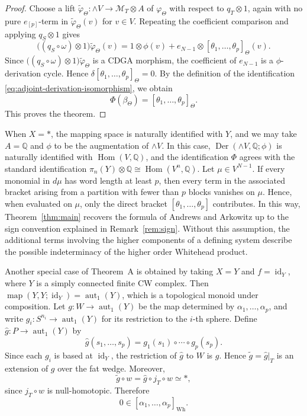 \documentclass[a4paper,10pt]{amsart}
\theoremstyle{definition}
\theoremstyle{remark}
\newcommand{\map}{\operatorname{map}}
\newcommand{\aut}{\operatorname{aut}}
\newcommand{\Der}{\operatorname{Der}}
\newcommand{\Hom}{\operatorname{Hom}}
\newcommand{\id}{\operatorname{id}}
\numberwithin{equation}{section}
\begin{document}
\begin{proof}
Choose a lift
$
\widetilde\varphi_\Theta:\wedge V\to\mathcal M_T\otimes A
$
of $\varphi_\Theta$ with respect to $q_T\otimes 1$, again with no pure
$e_{[p]}$-term in $\widetilde\varphi_\Theta(v)$ for $v\in V$.
Repeating the coefficient comparison and applying $q_S\otimes1$ gives
\[
\bigl((q_S\circ\omega)\otimes1\bigr)
\widetilde\varphi_\Theta(v)
=
1\otimes\phi(v)
+
e_{N-1}\otimes
[\theta_1,\ldots,\theta_p]_\Theta(v).
\]
Since
$
\bigl((q_S\circ\omega)\otimes1\bigr)
\widetilde\varphi_\Theta$ is a CDGA morphism, the coefficient of $e_{N-1}$ is a
$\phi$-derivation cycle. Hence
$
\delta[\theta_1,\ldots,\theta_p]_\Theta=0.
$
By the definition of the identification \eqref{eq:adjoint-derivation-isomorphism},
we obtain
\[
\Phi(\beta_\Theta)
=
[\theta_1,\ldots,\theta_p]_\Theta.
\]
This proves the theorem.
\end{proof}


When $X=*$, the mapping space is naturally identified with $Y$, and we may take $A=\mathbb Q$ and $\phi$ to be the augmentation of $\wedge V$.
In this case, $\Der(\wedge V,\mathbb Q;\phi)$ is naturally identified with $\Hom(V,\mathbb Q)$, and the identification $\Phi$ agrees with the standard identification
$
\pi_n(Y)\otimes\mathbb Q
\cong
\Hom(V^n,\mathbb Q).
$
Let $\mu\in V^{N-1}$.
If every monomial in $d\mu$ has word length at least $p$, then every term in the associated bracket arising from a partition with fewer than $p$ blocks vanishes on $\mu$.
Hence, when evaluated on $\mu$, only the direct bracket
$[\theta_1,\ldots,\theta_p]$ contributes.
In this way, Theorem~\ref{thm:main} recovers the formula of Andrews and Arkowitz \cite[Theorem~5.4]{AA1978} up to the sign convention explained in Remark~\ref{rem:sign}.
Without this assumption, the additional terms involving the higher components of a defining system describe the possible indeterminacy of the higher order Whitehead product.


Another special case of Theorem~A is obtained by taking $X=Y$ and
$f=\id_Y$, where $Y$ is a simply connected finite CW complex.
Then $\map(Y,Y;\id_Y)=\aut_1(Y)$, which is a topological monoid under
composition.
Let $g:W\to\aut_1(Y)$ be the map determined by
$\alpha_1,\ldots,\alpha_p$, and write
$g_i:S^{n_i}\to\aut_1(Y)$ for its restriction to the $i$-th sphere.
Define $\widehat g:P\to\aut_1(Y)$ by
\[
        \widehat g(s_1,\ldots,s_p)
        =
        g_1(s_1)\circ\cdots\circ g_p(s_p).
\]
Since each $g_i$ is based at $\id_Y$, the restriction of $\widehat g$
to $W$ is $g$. Hence $\widetilde g=\widehat g|_T$ is an extension of
$g$ over the fat wedge. Moreover,
\[
        \widetilde g\circ w
        =
        \widehat g\circ j_T\circ w
        \simeq *,
\]
since $j_T\circ w$ is null-homotopic. Therefore
\[
        0\in[\alpha_1,\ldots,\alpha_p]_{\mathrm{Wh}}.
\]
\end{document}
